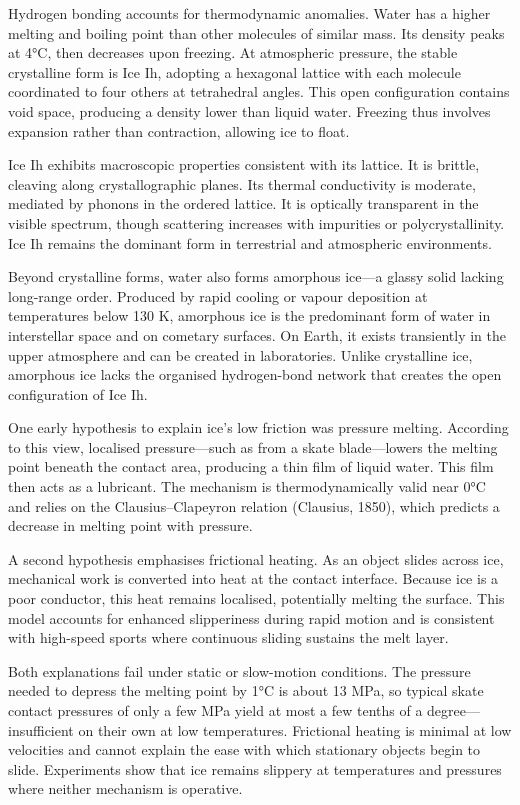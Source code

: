 Hydrogen bonding accounts for thermodynamic anomalies. Water has a higher melting and boiling point than other molecules of similar mass. Its density peaks at 4°C, then decreases upon freezing. At atmospheric pressure, the stable crystalline form is Ice Ih, adopting a hexagonal lattice with each molecule coordinated to four others at tetrahedral angles. This open configuration contains void space, producing a density lower than liquid water. Freezing thus involves expansion rather than contraction, allowing ice to float.

Ice Ih exhibits macroscopic properties consistent with its lattice. It is brittle, cleaving along crystallographic planes. Its thermal conductivity is moderate, mediated by phonons in the ordered lattice. It is optically transparent in the visible spectrum, though scattering increases with impurities or polycrystallinity. Ice Ih remains the dominant form in terrestrial and atmospheric environments.

Beyond crystalline forms, water also forms amorphous ice—a glassy solid lacking long-range order. Produced by rapid cooling or vapour deposition at temperatures below 130 K, amorphous ice is the predominant form of water in interstellar space and on cometary surfaces. On Earth, it exists transiently in the upper atmosphere and can be created in laboratories. Unlike crystalline ice, amorphous ice lacks the organised hydrogen-bond network that creates the open configuration of Ice Ih.

One early hypothesis to explain ice's low friction was pressure melting. According to this view, localised pressure—such as from a skate blade—lowers the melting point beneath the contact area, producing a thin film of liquid water. This film then acts as a lubricant. The mechanism is thermodynamically valid near 0°C and relies on the Clausius–Clapeyron relation (Clausius, 1850), which predicts a decrease in melting point with pressure.

A second hypothesis emphasises frictional heating. As an object slides across ice, mechanical work is converted into heat at the contact interface. Because ice is a poor conductor, this heat remains localised, potentially melting the surface. This model accounts for enhanced slipperiness during rapid motion and is consistent with high-speed sports where continuous sliding sustains the melt layer.

Both explanations fail under static or slow-motion conditions. The pressure needed to depress the melting point by 1°C is about 13 MPa, so typical skate contact pressures of only a few MPa yield at most a few tenths of a degree—insufficient on their own at low temperatures. Frictional heating is minimal at low velocities and cannot explain the ease with which stationary objects begin to slide. Experiments show that ice remains slippery at temperatures and pressures where neither mechanism is operative.

